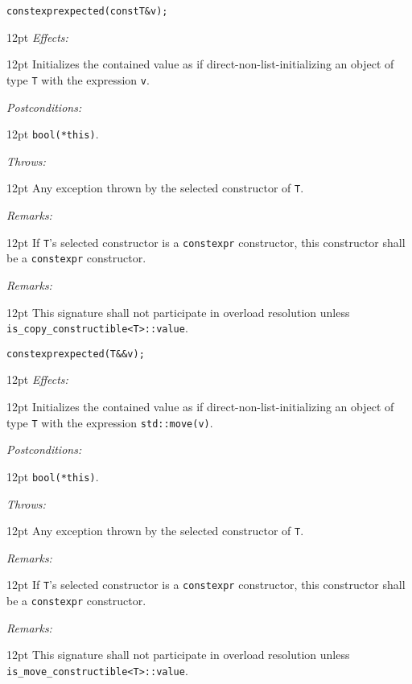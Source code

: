 \documentclass[a4paper,10pt]{article}
\newcommand{\cpp}[1]{\lstinline{#1}}
\newcommand{\wordingItem}[1]{\noindent\textit{#1:}}
\newenvironment{wordingTextItem}[1]{\wordingItem{#1}\vspace{2pt}\noindent\begin{adjustwidth}{12pt}{}}{\vspace{2pt}\end{adjustwidth}}
\newenvironment{wordingPara}{\begin{adjustwidth}{12pt}{}}{\end{adjustwidth}}
\begin{document}
\begin{alltt}
constexpr expected(const T& v);
\end{alltt}
\begin{wordingPara}
\begin{wordingTextItem}{Effects}
Initializes the contained value as if direct-non-list-initializing an object of type \cpp{T} with the expression \cpp{v}.
\end{wordingTextItem}
\begin{wordingTextItem}{Postconditions}
\cpp{bool(*this)}.
\end{wordingTextItem}
\begin{wordingTextItem}{Throws}
Any exception thrown by the selected constructor of \cpp{T}.
\end{wordingTextItem}
\begin{wordingTextItem}{Remarks}
If \cpp{T}'s selected constructor is a \cpp{constexpr} constructor, this constructor shall be a \cpp{constexpr} constructor.
\end{wordingTextItem}
\begin{wordingTextItem}{Remarks}
This signature shall not participate in overload resolution unless\\
\cpp{is_copy_constructible<T>::value}. 
\end{wordingTextItem}
\end{wordingPara}

\begin{alltt}
constexpr expected(T&& v); 
\end{alltt}
\begin{wordingPara}
\begin{wordingTextItem}{Effects}
Initializes the contained value as if direct-non-list-initializing an object of type \cpp{T} with the expression \cpp{std::move(v)}.
\end{wordingTextItem}
\begin{wordingTextItem}{Postconditions}
\cpp{bool(*this)}.
\end{wordingTextItem}
\begin{wordingTextItem}{Throws}
Any exception thrown by the selected constructor of \cpp{T}.
\end{wordingTextItem}
\begin{wordingTextItem}{Remarks}
If \cpp{T}'s selected constructor is a \cpp{constexpr} constructor, this constructor shall be a \cpp{constexpr} constructor.
\end{wordingTextItem}
\begin{wordingTextItem}{Remarks}
This signature shall not participate in overload resolution unless\\
\cpp{is_move_constructible<T>::value}.
\end{wordingTextItem}
\end{wordingPara}
\end{document}
